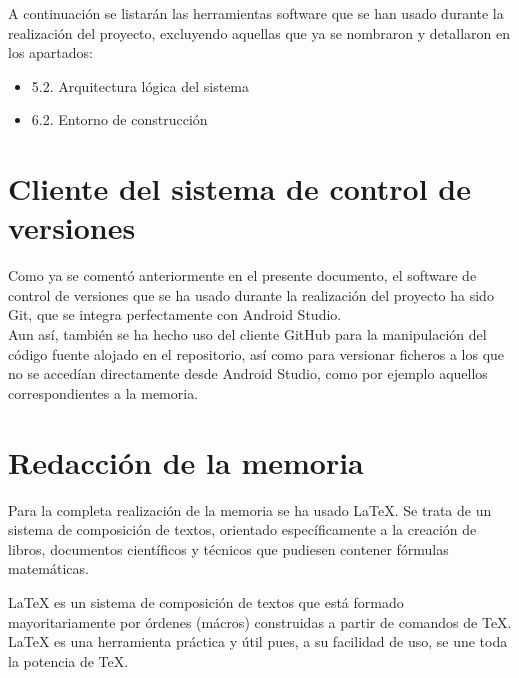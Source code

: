

A continuación se listarán las herramientas software que se han usado durante la realización del proyecto, excluyendo aquellas que ya se nombraron y detallaron en los apartados:

\begin{itemize}
\item 5.2. Arquitectura lógica del sistema
\item 6.2. Entorno de construcción
\end{itemize}

\section{Cliente del sistema de control de versiones}

Como ya se comentó anteriormente en el presente documento, el software de control de versiones que se ha usado durante la realización del proyecto ha sido Git, que se integra perfectamente con Android Studio.\\

Aun así, también se ha hecho uso del cliente GitHub para la manipulación del código fuente alojado en el repositorio, así como para versionar ficheros a los que no se accedían directamente desde Android Studio, como por ejemplo aquellos correspondientes a la memoria.


\section{Redacción de la memoria}

Para la completa realización de la memoria se ha usado LaTeX. Se trata de un sistema de composición de textos, orientado específicamente a la creación de libros, documentos científicos y técnicos que pudiesen contener fórmulas matemáticas.\\


LaTeX es un sistema de composición de textos que está formado mayoritariamente por órdenes (mácros) construidas a partir de comandos de TeX. LaTeX es una herramienta práctica y útil pues, a su facilidad de uso, se une toda la potencia de TeX.

